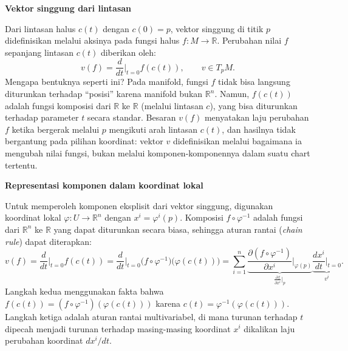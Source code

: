 \vspace{0.5em}
\noindent \textbf{Vektor singgung dari lintasan}

Dari lintasan halus $c(t)$ dengan $c(0) = p$, vektor singgung di titik $p$ didefinisikan melalui aksinya pada fungsi halus $f : M \to \mathbb{R}$. Perubahan nilai $f$ sepanjang lintasan $c(t)$ diberikan oleh:
\begin{equation}\label{eq:tangent-action-f}
    v(f) = \frac{d}{dt}\bigg|_{t=0} f(c(t)),
    \qquad v \in T_pM.
\end{equation}
Mengapa bentuknya seperti ini? Pada manifold, fungsi $f$ tidak bisa langsung diturunkan terhadap ``posisi'' karena manifold bukan $\mathbb{R}^n$. Namun, $f(c(t))$ adalah fungsi komposisi dari $\mathbb{R}$ ke $\mathbb{R}$ (melalui lintasan $c$), yang bisa diturunkan terhadap parameter $t$ secara standar. Besaran $v(f)$ menyatakan laju perubahan $f$ ketika bergerak melalui $p$ mengikuti arah lintasan $c(t)$, dan hasilnya tidak bergantung pada pilihan koordinat: vektor $v$ didefinisikan melalui bagaimana ia mengubah nilai fungsi, bukan melalui komponen-komponennya dalam suatu chart tertentu.

\vspace{0.5em}
\noindent \textbf{Representasi komponen dalam koordinat lokal}

Untuk memperoleh komponen eksplisit dari vektor singgung, digunakan koordinat lokal $\varphi : U \to \mathbb{R}^n$ dengan $x^i = \varphi^i(p)$. Komposisi $f \circ \varphi^{-1}$ adalah fungsi dari $\mathbb{R}^n$ ke $\mathbb{R}$ yang dapat diturunkan secara biasa, sehingga aturan rantai (\textit{chain rule}) dapat diterapkan:
\begin{equation}\label{eq:chain-rule}
    v(f)
    = \frac{d}{dt}\bigg|_{t=0} f(c(t))
    = \frac{d}{dt}\bigg|_{t=0} \big(f \circ \varphi^{-1}\big)\big(\varphi(c(t))\big)
    = \sum_{i=1}^{n}
      \underbrace{\frac{\partial(f \circ \varphi^{-1})}{\partial x^i}\bigg|_{\varphi(p)}}_{\displaystyle \frac{\partial f}{\partial x^i}\big|_p}
      \underbrace{\frac{dx^i}{dt}\bigg|_{t=0}}_{\displaystyle v^i}.
\end{equation}
Langkah kedua menggunakan fakta bahwa $f(c(t)) = (f \circ \varphi^{-1})(\varphi(c(t)))$ karena $c(t) = \varphi^{-1}(\varphi(c(t)))$. Langkah ketiga adalah aturan rantai multivariabel, di mana turunan terhadap $t$ dipecah menjadi turunan terhadap masing-masing koordinat $x^i$ dikalikan laju perubahan koordinat $dx^i/dt$.

